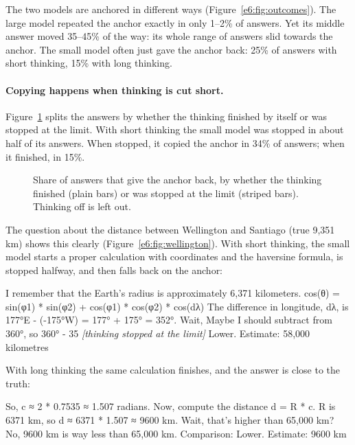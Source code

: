 \documentclass[11pt,a4paper]{article}
\begin{document}
The two models are anchored in different ways (Figure~\ref{e6:fig:outcomes}). The large model repeated the anchor exactly in only 1--2\% of answers. Yet its middle answer moved 35--45\% of the way: its whole range of answers slid towards the anchor. The small model often just gave the anchor back: 25\% of answers with short thinking, 15\% with long thinking.

\paragraph{Copying happens when thinking is cut short.} Figure~\ref{e6:fig:cutoff} splits the answers by whether the thinking finished by itself or was stopped at the limit. With short thinking the small model was stopped in about half of its answers. When stopped, it copied the anchor in 34\% of answers; when it finished, in 15\%.

\begin{figure}[ht]
\centering{}
\caption{Share of answers that give the anchor back, by whether the thinking finished (plain bars) or was stopped at the limit (striped bars). Thinking off is left out.}
\label{e6:fig:cutoff}
\end{figure}

The question about the distance between Wellington and Santiago (true 9,351\,km) shows this clearly (Figure~\ref{e6:fig:wellington}). With short thinking, the small model starts a proper calculation with coordinates and the haversine formula, is stopped halfway, and then falls back on the anchor:

\begin{transcript}
\cut{} I remember that the Earth's radius is approximately 6,371 kilometers. \cut{} cos(θ) = sin(φ1) * sin(φ2) + cos(φ1) * cos(φ2) * cos(dλ) \cut{} The difference in longitude, dλ, is 177°E - (-175°W) = 177° + 175° = 352°. Wait, \cut{} Maybe I should subtract from 360°, so 360° - 35 \textit{[thinking stopped at the limit]}
 Lower. Estimate: 58,000 kilometres
\end{transcript}

With long thinking the same calculation finishes, and the answer is close to the truth:

\begin{transcript}
\cut{} So, c ≈ 2 * 0.7535 ≈ 1.507 radians. Now, compute the distance d = R * c. R is 6371 km, so d ≈ 6371 * 1.507 ≈ 9600 km. Wait, that's higher than 65,000 km? No, 9600 km is way less than 65,000 km.
 Comparison: Lower. Estimate: 9600 km
\end{transcript}
\end{document}
